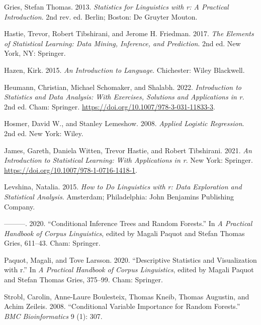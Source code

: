 \documentclass[
  11pt,
  letterpaper,
  DIV=11,
  numbers=noendperiod]{scrreprt}
\newlength{\cslhangindent}
\newenvironment{CSLReferences}[2] %
 {\begin{list}{}{%
  \setlength{\itemindent}{0pt}
  \setlength{\leftmargin}{0pt}
  \setlength{\parsep}{0pt}
  \ifodd #1
   \setlength{\leftmargin}{\cslhangindent}
   \setlength{\itemindent}{-1\cslhangindent}
  \fi
  \setlength{\itemsep}{#2\baselineskip}}}
 {\end{list}}
\begin{document}
\begin{CSLReferences}{1}{0}
Gries, Stefan Thomas. 2013. \emph{Statistics for Linguistics with r: A
Practical Introduction}. 2nd rev. ed. Berlin; Boston: De Gruyter Mouton.

Hastie, Trevor, Robert Tibshirani, and Jerome H. Friedman. 2017.
\emph{The Elements of Statistical Learning: Data Mining, Inference, and
Prediction}. 2nd ed. New York, NY: Springer.

Hazen, Kirk. 2015. \emph{An Introduction to Language}. Chichester: Wiley
Blackwell.

Heumann, Christian, Michael Schomaker, and Shalabh. 2022.
\emph{Introduction to Statistics and Data Analysis: With Exercises,
Solutions and Applications in r}. 2nd ed. Cham: Springer.
\url{https://doi.org/10.1007/978-3-031-11833-3}.

Hosmer, David W., and Stanley Lemeshow. 2008. \emph{Applied Logistic
Regression}. 2nd ed. New York: Wiley.

James, Gareth, Daniela Witten, Trevor Hastie, and Robert Tibshirani.
2021. \emph{An Introduction to Statistical Learning: With Applications
in r}. New York: Springer.
\url{https://doi.org/10.1007/978-1-0716-1418-1}.

Levshina, Natalia. 2015. \emph{How to Do Linguistics with r: Data
Exploration and Statistical Analysis}. Amsterdam; Philadelphia: John
Benjamins Publishing Company.

---------. 2020. {``Conditional Inference Trees and Random Forests.''}
In \emph{A Practical Handbook of Corpus Linguistics}, edited by Magali
Paquot and Stefan Thomas Gries, 611--43. Cham: Springer.

Paquot, Magali, and Tove Larsson. 2020. {``Descriptive Statistics and
Visualization with r.''} In \emph{A Practical Handbook of Corpus
Linguistics}, edited by Magali Paquot and Stefan Thomas Gries, 375--99.
Cham: Springer.

Strobl, Carolin, Anne-Laure Boulesteix, Thomas Kneib, Thomas Augustin,
and Achim Zeileis. 2008. {``Conditional Variable Importance for Random
Forests.''} \emph{BMC Bioinformatics} 9 (1): 307.


\end{CSLReferences}
\end{document}
